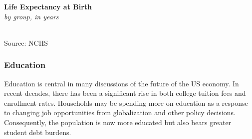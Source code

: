 \documentclass{report}
\makeatletter
\newcommand{\tbllink}[1]{\href{https://raw.githubusercontent.com/bdecon/US-chartbook/master/chartbook/data/#1}{\faTable}}
\newcommand*\short[1]{\expandafter\@gobbletwo\number\numexpr#1\relax}
\newcommand{\absnode}[3]{\node[below right, align=left] at (axis cs: #1,#2) {#3};}
\newcommand{\shdateaxisticks}{
		date coordinates in=x, axis line style={draw=none},
		xmax={2024-01-31},
		max space between ticks=40,	    
		xtick={{1990-01-01}, {1995-01-01}, {2000-01-01}, 
			{2005-01-01}, {2010-01-01}, {2015-01-01}, {2020-01-01}},
		minor xtick={},
		enlarge y limits={0.06}, enlarge x limits={0.01},
		xticklabel style={align=center, yshift=-2pt}, tick label style={inner sep=0pt},
		}
\newcommand{\bbar}[2]{extra #1 ticks = {{#2}}, extra #1 tick labels = ,
		extra #1 tick style = {grid=major, grid style={thick, black!25}},}
\newcommand{\thickline}[4]{\addplot[ultra thick, no markers, color=#1] 
		table [x=#2, y=#3, col sep=comma] {#4};	}
\newcommand{\rbars}{
		\fill[color=black!10] (axis cs:{1990-07-01},\pgfkeysvalueof{/pgfplots/ymin})
			rectangle (axis cs:{1991-03-01}, \pgfkeysvalueof{/pgfplots/ymax});
		\fill[color=black!10] (axis cs:{2007-12-01},\pgfkeysvalueof{/pgfplots/ymin})
			rectangle (axis cs:{2009-07-01}, \pgfkeysvalueof{/pgfplots/ymax});
		\fill[color=black!10] (axis cs:{2001-03-01},\pgfkeysvalueof{/pgfplots/ymin})
			rectangle (axis cs:{2001-11-01}, \pgfkeysvalueof{/pgfplots/ymax});
		\fill[color=black!10] (axis cs:{2020-02-01},\pgfkeysvalueof{/pgfplots/ymin})
			rectangle (axis cs:{2020-05-01}, \pgfkeysvalueof{/pgfplots/ymax});}
\makeatother
\begin{document}
{\begin{minipage}{1.0\textwidth}
\begin{minipage}{0.445\textwidth} 
\normalsize \textbf{Life Expectancy at Birth}\\
\footnotesize{\textit{by group, in years}}\\
\noindent \hspace*{-1mm} \\
\footnotesize{Source: NCHS} \hfill \tbllink{life_exp.csv} \ \ \end{minipage}\hfill
\begin{minipage}{0.5\textwidth}
\small 
\end{minipage}
\end{minipage}
\newpage
\begin{minipage}{1.0\textwidth} 
\subsubsection*{Education}
\small Education is central in many discussions of the future of the US economy. In recent decades, there has been a significant rise in both college tuition fees and enrollment rates. Households may be spending more on education as a response to changing job opportunities from globalization and other policy decisions. Consequently, the population is now more educated but also bears greater student debt burdens.
\end{minipage}
\vspace{1mm}

}
\end{document}
